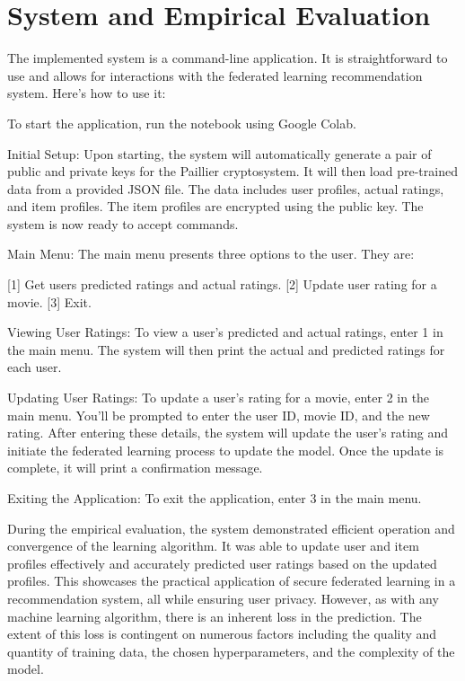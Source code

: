 \documentclass{article}
\begin{document}
\section{System and Empirical Evaluation}
The implemented system is a command-line application. It is straightforward to use and allows for interactions with the federated learning recommendation system. Here's how to use it:

To start the application, run the notebook using Google Colab.

Initial Setup: Upon starting, the system will automatically generate a pair of public and private keys for the Paillier cryptosystem. It will then load pre-trained data from a provided JSON file. The data includes user profiles, actual ratings, and item profiles. The item profiles are encrypted using the public key. The system is now ready to accept commands.

Main Menu: The main menu presents three options to the user. They are:

[1] Get users predicted ratings and actual ratings.
[2] Update user rating for a movie.
[3] Exit.

Viewing User Ratings: To view a user's predicted and actual ratings, enter 1 in the main menu. The system will then print the actual and predicted ratings for each user.

Updating User Ratings: To update a user's rating for a movie, enter 2 in the main menu. You'll be prompted to enter the user ID, movie ID, and the new rating. After entering these details, the system will update the user's rating and initiate the federated learning process to update the model. Once the update is complete, it will print a confirmation message.

Exiting the Application: To exit the application, enter 3 in the main menu.

During the empirical evaluation, the system demonstrated efficient operation and convergence of the learning algorithm. It was able to update user and item profiles effectively and accurately predicted user ratings based on the updated profiles. This showcases the practical application of secure federated learning in a recommendation system, all while ensuring user privacy. However, as with any machine learning algorithm, there is an inherent loss in the prediction. The extent of this loss is contingent on numerous factors including the quality and quantity of training data, the chosen hyperparameters, and the complexity of the model.
\end{document}
